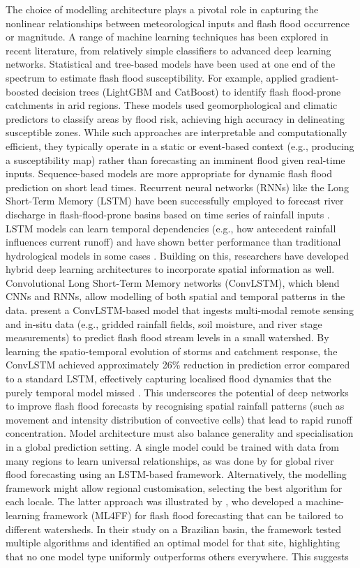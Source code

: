 The choice of modelling architecture plays a pivotal role in capturing the nonlinear relationships between meteorological inputs and flash flood occurrence or magnitude. A range of machine learning techniques has been explored in recent literature, from relatively simple classifiers to advanced deep learning networks. Statistical and tree-based models have been used at one end of the spectrum to estimate flash flood susceptibility. For example, \citet{Saber2022} applied gradient-boosted decision trees (LightGBM and CatBoost) to identify flash flood-prone catchments in arid regions. These models used geomorphological and climatic predictors to classify areas by flood risk, achieving high accuracy in delineating susceptible zones. While such approaches are interpretable and computationally efficient, they typically operate in a static or event-based context (e.g., producing a susceptibility map) rather than forecasting an imminent flood given real-time inputs. Sequence-based models are more appropriate for dynamic flash flood prediction on short lead times. Recurrent neural networks (RNNs) like the Long Short-Term Memory (LSTM) have been successfully employed to forecast river discharge in flash-flood-prone basins based on time series of rainfall inputs \citep{Song2020}. LSTM models can learn temporal dependencies (e.g., how antecedent rainfall influences current runoff) and have shown better performance than traditional hydrological models in some cases \citep{Song2020}. Building on this, researchers have developed hybrid deep learning architectures to incorporate spatial information as well. Convolutional Long Short-Term Memory networks (ConvLSTM), which blend CNNs and RNNs, allow modelling of both spatial and temporal patterns in the data. \citet{Oddo2024} present a ConvLSTM-based model that ingests multi-modal remote sensing and in-situ data (e.g., gridded rainfall fields, soil moisture, and river stage measurements) to predict flash flood stream levels in a small watershed. By learning the spatio-temporal evolution of storms and catchment response, the ConvLSTM achieved approximately 26\% reduction in prediction error compared to a standard LSTM, effectively capturing localised flood dynamics that the purely temporal model missed \citep{Oddo2024}. This underscores the potential of deep networks to improve flash flood forecasts by recognising spatial rainfall patterns (such as movement and intensity distribution of convective cells) that lead to rapid runoff concentration. Model architecture must also balance generality and specialisation in a global prediction setting. A single model could be trained with data from many regions to learn universal relationships, as was done by \citet{Gilon2024} for global river flood forecasting using an LSTM-based framework. Alternatively, the modelling framework might allow regional customisation, selecting the best algorithm for each locale. The latter approach was illustrated by \citet{Soares2025}, who developed a machine-learning framework (ML4FF) for flash flood forecasting that can be tailored to different watersheds. In their study on a Brazilian basin, the framework tested multiple algorithms and identified an optimal model for that site, highlighting that no one model type uniformly outperforms others everywhere. This suggests 